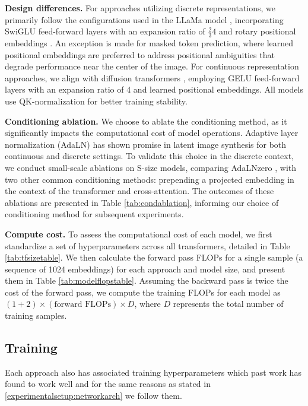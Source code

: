 \textbf{Design differences.} For approaches utilizing discrete representations, we primarily follow the configurations used in the LLaMa model \citep{touvron2023llama}, incorporating SwiGLU feed-forward layers with an expansion ratio of \( \frac{2}{3}4 \) and rotary positional embeddings \citep{su2023roformer}. An exception is made for masked token prediction, where learned positional embeddings are preferred to address positional ambiguities that degrade performance near the center of the image. For continuous representation approaches, we align with diffusion transformers \citep{peebles2023scalable}, employing GELU feed-forward layers with an expansion ratio of 4 and learned positional embeddings. All models use QK-normalization \citep{dehghani2023scaling} for better training stability.

\textbf{Conditioning ablation.} We choose to ablate the conditioning method, as it significantly impacts the computational cost of model operations. Adaptive layer normalization (AdaLN) \citep{perez2017film} has shown promise in latent image synthesis for both continuous \citep{peebles2023scalable} and discrete \citep{tian2024visual} settings. To validate this choice in the discrete context, we conduct small-scale ablations on S-size models, comparing AdaLNzero \citep{peebles2023scalable}, with two other common conditioning methods: prepending a projected embedding in the context of the transformer and cross-attention. The outcomes of these ablations are presented in Table \ref{tab:condablation}, informing our choice of conditioning method for subsequent experiments.

\textbf{Compute cost.} To assess the computational cost of each model, we first standardize a set of hyperparameters across all transformers, detailed in Table \ref{tab:tfsizetable}. We then calculate the forward pass FLOPs for a single sample (a sequence of 1024 embeddings) for each approach and model size, and present them in Table \ref{tab:modelflopstable}. Assuming the backward pass is twice the cost of the forward pass, we compute the training FLOPs for each model as \( (1 + 2) \times (\text{forward FLOPs}) \times D \), where \( D \) represents the total number of training samples.

\modelflopstable

\subsection{Training}
Each approach also has associated training hyperparameters which past work has found to work well and for the same reasons as stated in \ref{experimentalsetup:networkarch} we follow them. 

